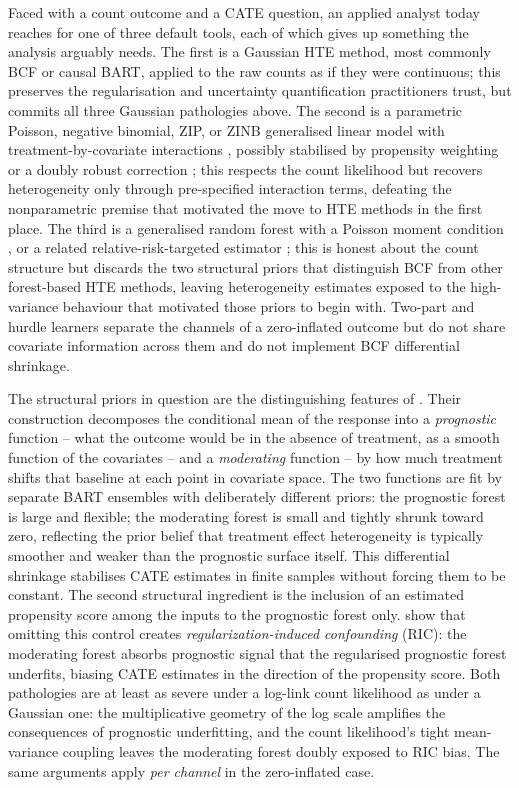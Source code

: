 \documentclass[11pt]{article}
\theoremstyle{plain}
\theoremstyle{definition}
\theoremstyle{remark}
\begin{document}
Faced with a count outcome and a CATE question, an applied analyst
today reaches for one of three default tools, each of which gives up
something the analysis arguably needs. The first is a Gaussian HTE
method, most commonly BCF or causal BART, applied to the raw counts
as if they were continuous; this preserves the regularisation and
uncertainty quantification practitioners trust, but commits all three
Gaussian pathologies above. The second is a parametric Poisson,
negative binomial, ZIP, or ZINB generalised linear model with
treatment-by-covariate interactions \citep{camerontrivedi2013count,
lambert1992zip, greene1994zinb}, possibly stabilised by propensity
weighting \citep{rosenbaum1983central} or a doubly robust correction
\citep{chernozhukov2018double}; this respects the count likelihood
but recovers heterogeneity only through pre-specified interaction
terms, defeating the nonparametric premise that motivated the move
to HTE methods in the first place. The third is a generalised random
forest with a Poisson moment condition \citep{athey2019generalized},
or a related relative-risk-targeted estimator
\citep{kennedy2024relative}; this is honest about the count structure
but discards the two structural priors that distinguish BCF from
other forest-based HTE methods, leaving heterogeneity estimates
exposed to the high-variance behaviour that motivated those priors
to begin with. Two-part and hurdle learners \citep{mullahy1986hurdle}
separate the channels of a zero-inflated outcome but do not share
covariate information across them and do not implement BCF
differential shrinkage.

The structural priors in question are the distinguishing features of
\citet{hahn2020bayesian}. Their construction decomposes the
conditional mean of the response into a \emph{prognostic} function --
what the outcome would be in the absence of treatment, as a smooth
function of the covariates -- and a \emph{moderating} function -- by
how much treatment shifts that baseline at each point in covariate
space. The two functions are fit by separate BART ensembles with
deliberately different priors: the prognostic forest is large and
flexible; the moderating forest is small and tightly shrunk toward
zero, reflecting the prior belief that treatment effect heterogeneity
is typically smoother and weaker than the prognostic surface itself.
This differential shrinkage stabilises CATE estimates in finite
samples without forcing them to be constant. The second structural
ingredient is the inclusion of an estimated propensity score among
the inputs to the prognostic forest only. \citet{hahn2020bayesian}
show that omitting this control creates \emph{regularization-induced
confounding} (RIC): the moderating forest absorbs prognostic signal
that the regularised prognostic forest underfits, biasing CATE
estimates in the direction of the propensity score. Both pathologies
are at least as severe under a log-link count likelihood as under a
Gaussian one: the multiplicative geometry of the log scale amplifies
the consequences of prognostic underfitting, and the count
likelihood's tight mean-variance coupling leaves the moderating
forest doubly exposed to RIC bias. The same arguments apply
\emph{per channel} in the zero-inflated case.
\end{document}
